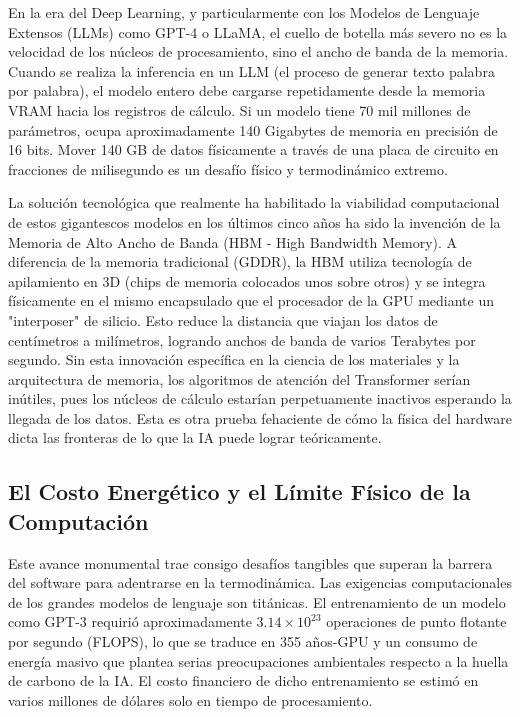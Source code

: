 \documentclass[12pt,a4paper]{article}
\begin{document}
En la era del Deep Learning, y particularmente con los Modelos de Lenguaje Extensos (LLMs) como GPT-4 o LLaMA, el cuello de botella más severo no es la velocidad de los núcleos de procesamiento, sino el ancho de banda de la memoria. Cuando se realiza la inferencia en un LLM (el proceso de generar texto palabra por palabra), el modelo entero debe cargarse repetidamente desde la memoria VRAM hacia los registros de cálculo. Si un modelo tiene 70 mil millones de parámetros, ocupa aproximadamente 140 Gigabytes de memoria en precisión de 16 bits. Mover 140 GB de datos físicamente a través de una placa de circuito en fracciones de milisegundo es un desafío físico y termodinámico extremo.

La solución tecnológica que realmente ha habilitado la viabilidad computacional de estos gigantescos modelos en los últimos cinco años ha sido la invención de la Memoria de Alto Ancho de Banda (HBM - High Bandwidth Memory). A diferencia de la memoria tradicional (GDDR), la HBM utiliza tecnología de apilamiento en 3D (chips de memoria colocados unos sobre otros) y se integra físicamente en el mismo encapsulado que el procesador de la GPU mediante un "interposer" de silicio. Esto reduce la distancia que viajan los datos de centímetros a milímetros, logrando anchos de banda de varios Terabytes por segundo. Sin esta innovación específica en la ciencia de los materiales y la arquitectura de memoria, los algoritmos de atención del Transformer serían inútiles, pues los núcleos de cálculo estarían perpetuamente inactivos esperando la llegada de los datos. Esta es otra prueba fehaciente de cómo la física del hardware dicta las fronteras de lo que la IA puede lograr teóricamente.


\subsection{El Costo Energético y el Límite Físico de la Computación}

Este avance monumental trae consigo desafíos tangibles que superan la barrera del software para adentrarse en la termodinámica. Las exigencias computacionales de los grandes modelos de lenguaje son titánicas. El entrenamiento de un modelo como GPT-3 requirió aproximadamente $3.14 \times 10^{23}$ operaciones de punto flotante por segundo (FLOPS), lo que se traduce en 355 años-GPU y un consumo de energía masivo que plantea serias preocupaciones ambientales respecto a la huella de carbono de la IA. El costo financiero de dicho entrenamiento se estimó en varios millones de dólares solo en tiempo de procesamiento.  
\end{document}
